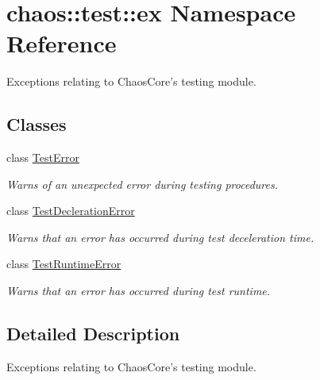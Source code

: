 \hypertarget{namespacechaos_1_1test_1_1ex}{\section{chaos\-:\-:test\-:\-:ex Namespace Reference}
\label{namespacechaos_1_1test_1_1ex}
}


Exceptions relating to Chaos\-Core's testing module.  


\subsection*{Classes}
\begin{DoxyCompactItemize}
\item 
class \hyperlink{classchaos_1_1test_1_1ex_1_1_test_error}{Test\-Error}
\begin{DoxyCompactList}\small\item\em Warns of an unexpected error during testing procedures. \end{DoxyCompactList}\item 
class \hyperlink{classchaos_1_1test_1_1ex_1_1_test_decleration_error}{Test\-Decleration\-Error}
\begin{DoxyCompactList}\small\item\em Warns that an error has occurred during test deceleration time. \end{DoxyCompactList}\item 
class \hyperlink{classchaos_1_1test_1_1ex_1_1_test_runtime_error}{Test\-Runtime\-Error}
\begin{DoxyCompactList}\small\item\em Warns that an error has occurred during test runtime. \end{DoxyCompactList}\end{DoxyCompactItemize}


\subsection{Detailed Description}
Exceptions relating to Chaos\-Core's testing module. 
